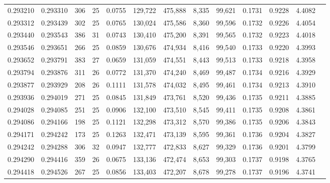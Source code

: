 \begin{tabular}{rrrrrrrrrrrrr}
0.293210 & 0.293310 &   306 &  25 &                                     0.0755 & 129,722 & 475,888 &   8,335 &  99,621 & 0.1731 & 0.9228 & 4.4082 \\
0.293312 & 0.293439 &   302 &  25 &                                     0.0765 & 130,024 & 475,586 &   8,360 &  99,596 & 0.1732 & 0.9226 & 4.4054 \\
0.293440 & 0.293543 &   386 &  31 &                                     0.0743 & 130,410 & 475,200 &   8,391 &  99,565 & 0.1732 & 0.9223 & 4.4018 \\
0.293546 & 0.293651 &   266 &  25 &                                     0.0859 & 130,676 & 474,934 &   8,416 &  99,540 & 0.1733 & 0.9220 & 4.3993 \\
0.293652 & 0.293791 &   383 &  27 &                                     0.0659 & 131,059 & 474,551 &   8,443 &  99,513 & 0.1733 & 0.9218 & 4.3958 \\
0.293794 & 0.293876 &   311 &  26 &                                     0.0772 & 131,370 & 474,240 &   8,469 &  99,487 & 0.1734 & 0.9216 & 4.3929 \\
0.293877 & 0.293929 &   208 &  26 &                                     0.1111 & 131,578 & 474,032 &   8,495 &  99,461 & 0.1734 & 0.9213 & 4.3910 \\
0.293936 & 0.294019 &   271 &  25 &                                     0.0845 & 131,849 & 473,761 &   8,520 &  99,436 & 0.1735 & 0.9211 & 4.3885 \\
0.294028 & 0.294085 &   251 &  25 &                                     0.0906 & 132,100 & 473,510 &   8,545 &  99,411 & 0.1735 & 0.9208 & 4.3861 \\
0.294086 & 0.294166 &   198 &  25 &                                     0.1121 & 132,298 & 473,312 &   8,570 &  99,386 & 0.1735 & 0.9206 & 4.3843 \\
0.294171 & 0.294242 &   173 &  25 &                                     0.1263 & 132,471 & 473,139 &   8,595 &  99,361 & 0.1736 & 0.9204 & 4.3827 \\
0.294242 & 0.294288 &   306 &  32 &                                     0.0947 & 132,777 & 472,833 &   8,627 &  99,329 & 0.1736 & 0.9201 & 4.3799 \\
0.294290 & 0.294416 &   359 &  26 &                                     0.0675 & 133,136 & 472,474 &   8,653 &  99,303 & 0.1737 & 0.9198 & 4.3765 \\
0.294418 & 0.294526 &   267 &  25 &                                     0.0856 & 133,403 & 472,207 &   8,678 &  99,278 & 0.1737 & 0.9196 & 4.3741 \\

\end{tabular}
